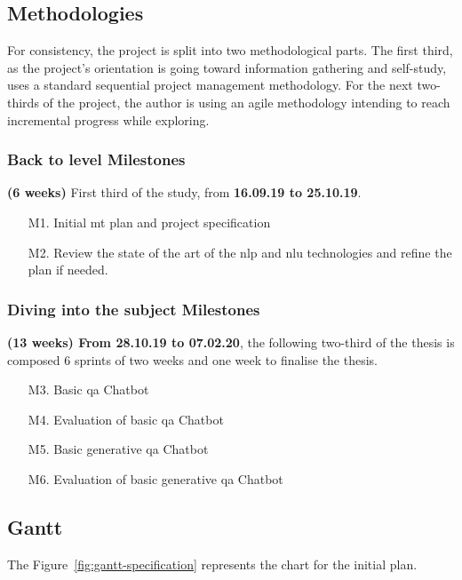 \subsection*{Methodologies}
For consistency, the project is split into two methodological parts. The first third, as the project's orientation is going toward information gathering and self-study, uses a standard sequential project management methodology. For the next two-thirds of the project, the author is using an agile methodology intending to reach incremental progress while exploring.

\subsubsection*{Back to level Milestones}
\textbf{(6 weeks)} First third of the study, from \textbf{16.09.19 to 25.10.19}.
\begin{enumerate}
    \setlength\itemsep{0em}
    \item[M1.] Initial \gls{mt} plan and project specification
    \item[M2.] Review the state of the art of the \gls{nlp} and \gls{nlu} technologies and refine the plan if needed.
\end{enumerate}


\subsubsection*{Diving into the subject Milestones}
\textbf{(13 weeks) From 28.10.19 to 07.02.20}, the following two-third of the thesis is composed 6 sprints of two weeks and one week to finalise the thesis.
\begin{itemize}
    \setlength\itemsep{0em}
    \item[M3.] Basic \gls{qa} Chatbot
    \item[M4.] Evaluation of basic \gls{qa} Chatbot
    \item[M5.] Basic generative \gls{qa} Chatbot
    \item[M6.] Evaluation of basic generative \gls{qa} Chatbot
\end{itemize}

\subsection*{Gantt}
The Figure~\ref{fig:gantt-specification} represents the chart for the initial plan.


